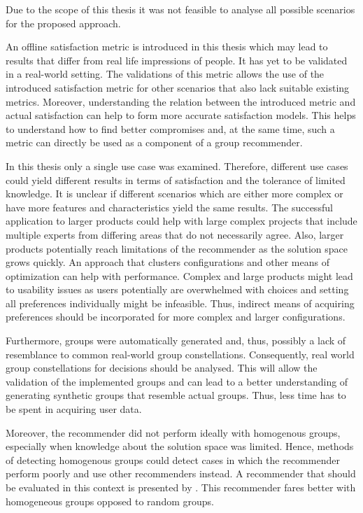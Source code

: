 Due to the scope of this thesis it was not feasible to analyse all possible scenarios for the proposed approach.

An offline satisfaction metric is introduced in this thesis which may lead to results that differ from real life impressions of people. It has yet to be validated in a real-world setting. The validations of this metric allows the use of the introduced satisfaction metric for other scenarios that also lack suitable existing metrics. Moreover, understanding the relation between the introduced metric and actual satisfaction can help to form more accurate satisfaction models. This helps to understand how to find better compromises and, at the same time, such a metric can directly be used as a component of a group recommender.

In this thesis only a single use case was examined. Therefore, different use cases could yield different results in terms of satisfaction and the tolerance of limited knowledge. It is unclear if different scenarios which are either more complex or have more features and characteristics yield the same results. The successful application to larger products could help with large complex projects that include multiple experts from differing areas that do not necessarily agree. Also, larger products potentially reach limitations of the recommender as the solution space grows quickly. An approach that clusters configurations and other means of optimization can help with performance. Complex and large products might lead to usability issues as users potentially are overwhelmed with choices and setting all preferences individually might be infeasible. Thus, indirect means of acquiring preferences should be incorporated for more complex and larger configurations. 

Furthermore, groups were automatically generated and, thus, possibly a lack of resemblance to common real-world group constellations. Consequently, real world group constellations for decisions should be analysed. This will allow the validation of the implemented groups and can lead to a better understanding of generating synthetic groups that resemble actual groups. Thus, less time has to be spent in acquiring user data.

Moreover, the recommender did not perform ideally with homogenous groups, especially when knowledge about the solution space was limited. Hence, methods of detecting homogenous groups could detect cases in which the recommender perform poorly and use other recommenders instead. A recommender that should be evaluated in this context is presented by \citeauthor{choudharyMulticriteriaGroupRecommender2020} \cite{choudharyMulticriteriaGroupRecommender2020}. This recommender fares better with homogeneous groups opposed to random groups.

